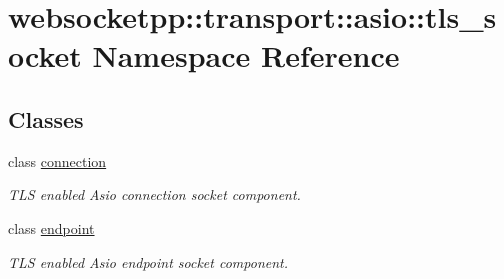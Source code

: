 \hypertarget{namespacewebsocketpp_1_1transport_1_1asio_1_1tls__socket}{}\section{websocketpp\+:\+:transport\+:\+:asio\+:\+:tls\+\_\+socket Namespace Reference}
\label{namespacewebsocketpp_1_1transport_1_1asio_1_1tls__socket}
\subsection*{Classes}
\begin{DoxyCompactItemize}
\item 
class \mbox{\hyperlink{classwebsocketpp_1_1transport_1_1asio_1_1tls__socket_1_1connection}{connection}}
\begin{DoxyCompactList}\small\item\em T\+LS enabled Asio connection socket component. \end{DoxyCompactList}\item 
class \mbox{\hyperlink{classwebsocketpp_1_1transport_1_1asio_1_1tls__socket_1_1endpoint}{endpoint}}
\begin{DoxyCompactList}\small\item\em T\+LS enabled Asio endpoint socket component. \end{DoxyCompactList}\end{DoxyCompactItemize}
